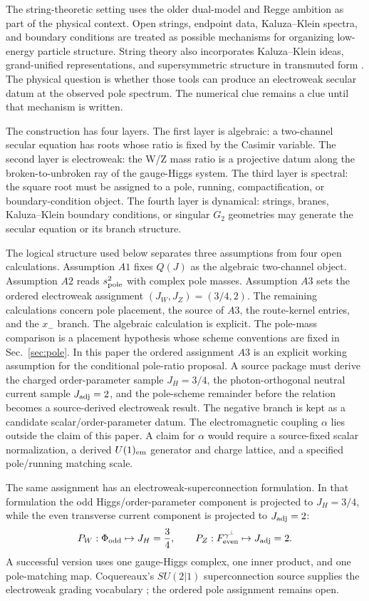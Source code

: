 The string-theoretic setting uses the older dual-model and Regge ambition as part of the physical context.  Open strings, endpoint data, Kaluza--Klein spectra, and boundary conditions are treated as possible mechanisms for organizing low-energy particle structure.  String theory also incorporates Kaluza--Klein ideas, grand-unified representations, and supersymmetric structure in transmuted form \cite{Polchinski1994}.  The physical question is whether those tools can produce an electroweak secular datum at the observed pole spectrum.  The numerical clue remains a clue until that mechanism is written.

The construction has four layers.  The first layer is algebraic: a two-channel secular equation has roots whose ratio is fixed by the Casimir variable.  The second layer is electroweak: the W/Z mass ratio is a projective datum along the broken-to-unbroken ray of the gauge-Higgs system.  The third layer is spectral: the square root must be assigned to a pole, running, compactification, or boundary-condition object.  The fourth layer is dynamical: strings, branes, Kaluza--Klein boundary conditions, or singular \(G_2\) geometries may generate the secular equation or its branch structure.

The logical structure used below separates three assumptions from four open
calculations.  Assumption \(A1\) fixes \(Q(J)\) as the algebraic two-channel
object.  Assumption \(A2\) reads \(s^2_{\rm pole}\) with complex pole masses.
Assumption \(A3\) sets the ordered electroweak assignment
\((J_W,J_Z)=(3/4,2)\).  The remaining calculations concern pole placement,
the source of \(A3\), the route-kernel entries, and the \(x_-\) branch.
The algebraic calculation is explicit.  The pole-mass comparison is a
placement hypothesis whose scheme conventions are fixed in Sec.~\ref{sec:pole}.
In this paper the ordered assignment \(A3\) is an explicit working
assumption for the conditional pole-ratio proposal.  A source package must
derive the charged order-parameter sample \(J_H=3/4\), the photon-orthogonal
neutral current sample \(J_{\rm adj}=2\), and the pole-scheme remainder before
the relation becomes a source-derived electroweak result.  The negative branch
is kept as a candidate scalar/order-parameter datum.
The electromagnetic coupling \(\alpha\) lies outside the claim of this paper.
A claim for \(\alpha\) would require a source-fixed scalar normalization, a
derived \(U(1)_{\rm em}\) generator and charge lattice, and a specified
pole/running matching scale.

The same assignment has an electroweak-superconnection formulation.  In that
formulation the odd Higgs/order-parameter component is projected to
\(J_H=3/4\), while the even transverse current component is projected to
\(J_{\rm adj}=2\):
\[
  P_W:\Phi_{\rm odd}\mapsto J_H=\frac34,
  \qquad
  P_Z:F_{\rm even}^{\gamma^\perp}\mapsto J_{\rm adj}=2 .
\]
A successful version uses one gauge-Higgs complex, one inner product, and one pole-matching map.  Coquereaux's \(SU(2|1)\) superconnection source supplies the electroweak grading vocabulary \cite{Coquereaux1992Superconnections}; the ordered pole assignment remains open.

